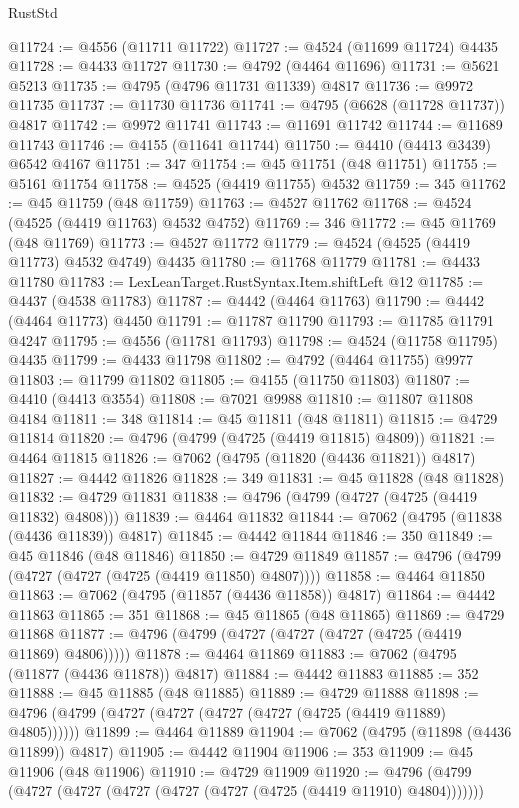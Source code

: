\begin{lexlean}{RustStd}
\begin{coremodule}
@11724 := @4556 (@11711 @11722)
@11727 := @4524 (@11699 @11724) @4435
@11728 := @4433 @11727
@11730 := @4792 (@4464 @11696)
@11731 := @5621 @5213
@11735 := @4795 (@4796 @11731 @11339) @4817
@11736 := @9972 @11735
@11737 := @11730 @11736
@11741 := @4795 (@6628 (@11728 @11737)) @4817
@11742 := @9972 @11741
@11743 := @11691 @11742
@11744 := @11689 @11743
@11746 := @4155 (@11641 @11744)
@11750 := @4410 (@4413 @3439) @6542 @4167
@11751 := 347
@11754 := @45 @11751 (@48 @11751)
@11755 := @5161 @11754
@11758 := @4525 (@4419 @11755) @4532
@11759 := 345
@11762 := @45 @11759 (@48 @11759)
@11763 := @4527 @11762
@11768 := @4524 (@4525 (@4419 @11763) @4532 @4752)
@11769 := 346
@11772 := @45 @11769 (@48 @11769)
@11773 := @4527 @11772
@11779 := @4524 (@4525 (@4419 @11773) @4532 @4749) @4435
@11780 := @11768 @11779
@11781 := @4433 @11780
@11783 := LexLeanTarget.RustSyntax.Item.shiftLeft @12
@11785 := @4437 (@4538 @11783)
@11787 := @4442 (@4464 @11763)
@11790 := @4442 (@4464 @11773) @4450
@11791 := @11787 @11790
@11793 := @11785 @11791 @4247
@11795 := @4556 (@11781 @11793)
@11798 := @4524 (@11758 @11795) @4435
@11799 := @4433 @11798
@11802 := @4792 (@4464 @11755) @9977
@11803 := @11799 @11802
@11805 := @4155 (@11750 @11803)
@11807 := @4410 (@4413 @3554)
@11808 := @7021 @9988
@11810 := @11807 @11808 @4184
@11811 := 348
@11814 := @45 @11811 (@48 @11811)
@11815 := @4729 @11814
@11820 := @4796 (@4799 (@4725 (@4419 @11815) @4809))
@11821 := @4464 @11815
@11826 := @7062 (@4795 (@11820 (@4436 @11821)) @4817)
@11827 := @4442 @11826
@11828 := 349
@11831 := @45 @11828 (@48 @11828)
@11832 := @4729 @11831
@11838 := @4796 (@4799 (@4727 (@4725 (@4419 @11832) @4808)))
@11839 := @4464 @11832
@11844 := @7062 (@4795 (@11838 (@4436 @11839)) @4817)
@11845 := @4442 @11844
@11846 := 350
@11849 := @45 @11846 (@48 @11846)
@11850 := @4729 @11849
@11857 := @4796 (@4799 (@4727 (@4727 (@4725 (@4419 @11850) @4807))))
@11858 := @4464 @11850
@11863 := @7062 (@4795 (@11857 (@4436 @11858)) @4817)
@11864 := @4442 @11863
@11865 := 351
@11868 := @45 @11865 (@48 @11865)
@11869 := @4729 @11868
@11877 := @4796 (@4799 (@4727 (@4727 (@4727 (@4725 (@4419 @11869) @4806)))))
@11878 := @4464 @11869
@11883 := @7062 (@4795 (@11877 (@4436 @11878)) @4817)
@11884 := @4442 @11883
@11885 := 352
@11888 := @45 @11885 (@48 @11885)
@11889 := @4729 @11888
@11898 := @4796 (@4799 (@4727 (@4727 (@4727 (@4727 (@4725 (@4419 @11889) @4805))))))
@11899 := @4464 @11889
@11904 := @7062 (@4795 (@11898 (@4436 @11899)) @4817)
@11905 := @4442 @11904
@11906 := 353
@11909 := @45 @11906 (@48 @11906)
@11910 := @4729 @11909
@11920 := @4796 (@4799 (@4727 (@4727 (@4727 (@4727 (@4727 (@4725 (@4419 @11910) @4804)))))))

\end{coremodule}
\end{lexlean}
